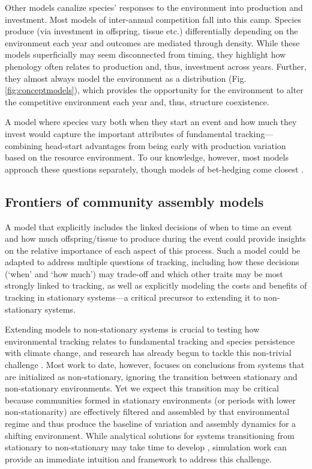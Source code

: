 \documentclass[11pt,letterpaper]{article}
\begin{document}
Other models canalize species' responses to the environment into production and investment. Most models of inter-annual competition \citep[most explicit examples of `modern coexistence theory,' e.g.,][]{Chesson:2004eo,Angert:2009} fall into this camp. Species produce (via investment in offspring, tissue etc.) differentially depending on the environment each year and outcomes are mediated through density. While these models superficially may seem disconnected from timing, they highlight how phenology often relates to production and, thus, investment across years. Further, they almost always model the environment as a distribution (Fig. \ref{fig:conceptmodels}), which provides the opportunity for the environment to alter the competitive environment each year and, thus, structure coexistence. 

A model where species vary both when they start an event and how much they invest would capture the important attributes of fundamental tracking---combining head-start advantages from being early with production variation based on the resource environment. To our knowledge, however, most models approach these questions separately, though models of bet-hedging come closest \citep{Gourbiere2009,tufto2015}. 

\subsection{Frontiers of community assembly models} %
A model that explicitly includes the linked decisions of when to time an event and how much offspring/tissue to produce during the event could provide insights on the relative importance of each aspect of this process. Such a model could be adapted to address multiple questions of tracking, including how these decisions (`when' and `how much') may trade-off and which other traits may be most strongly linked to tracking, as well as explicitly modeling the costs and benefits of tracking in stationary systems---a critical precursor to extending it to non-stationary systems. 

Extending models to non-stationary systems is crucial to testing how environmental tracking relates to fundamental tracking and species persistence with climate change, and research has already begun to tackle this non-trivial challenge \citep{chessonnonstat,legault2019,volkerass}. Most work to date, however, focuses on conclusions from systems that are initialized as non-stationary, ignoring the transition between stationary and non-stationary environments. Yet we expect this transition may be critical because communities formed in stationary environments (or periods with lower non-stationarity) are effectively filtered and assembled by that environmental regime and thus produce the baseline of variation and assembly dynamics for a shifting environment. While analytical solutions for systems transitioning from stationary to non-stationary may take time to develop \citep{chessonnonstat}, simulation work can provide an immediate intuition and framework to address this challenge. %
\end{document}
